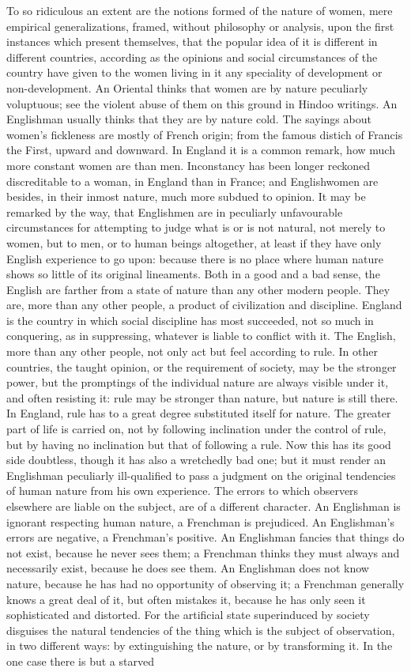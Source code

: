 \documentclass[12pt]{report}
\begin{document}
To so ridiculous an extent are the notions formed of the nature of women, mere empirical generalizations, framed, without philosophy or analysis, upon the first instances which present themselves, that the popular idea of it is different in different countries, according as the opinions and social circumstances of the country have given to the women living in it any speciality of development or non-development. An Oriental thinks that women are by nature peculiarly voluptuous; see the violent abuse of them on this ground in Hindoo writings. An Englishman usually thinks that they are by nature cold. The sayings about women's fickleness are mostly of French origin; from the famous distich of Francis the First, upward and downward. In England it is a common remark, how much more constant women are than men. Inconstancy has been longer reckoned discreditable to a woman, in England than in France; and Englishwomen are besides, in their inmost nature, much more subdued to opinion. It may be remarked by the way, that Englishmen are in peculiarly unfavourable circumstances for attempting to judge what is or is not natural, not merely to women, but to men, or to human beings altogether, at least if they have only English experience to go upon: because there is no place where human nature shows so little of its original lineaments. Both in a good and a bad sense, the English are farther from a state of nature than any other modern people. They are, more than any other people, a product of civilization and discipline. England is the country in which social discipline has most succeeded, not so much in conquering, as in suppressing, whatever is liable to conflict with it. The English, more than any other people, not only act but feel according to rule. In other countries, the taught opinion, or the requirement of society, may be the stronger power, but the promptings of the individual nature are always visible under it, and often resisting it: rule may be stronger than nature, but nature is still there. In England, rule has to a great degree substituted itself for nature. The greater part of life is carried on, not by following inclination under the control of rule, but by having no inclination but that of following a rule. Now this has its good side doubtless, though it has also a wretchedly bad one; but it must render an Englishman peculiarly ill-qualified to pass a judgment on the original tendencies of human nature from his own experience. The errors to which observers elsewhere are liable on the subject, are of a different character. An Englishman is ignorant respecting human nature, a Frenchman is prejudiced. An Englishman's errors are negative, a Frenchman's positive. An Englishman fancies that things do not exist, because he never sees them; a Frenchman thinks they must always and necessarily exist, because he does see them. An Englishman does not know nature, because he has had no opportunity of observing it; a Frenchman generally knows a great deal of it, but often mistakes it, because he has only seen it sophisticated and distorted. For the artificial state superinduced by society disguises the natural tendencies of the thing which is the subject of observation, in two different ways: by extinguishing the nature, or by transforming it. In the one case there is but a starved 
\end{document}
